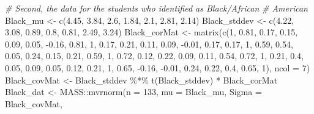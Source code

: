 \documentclass[
  11pt,
]{book}
\newenvironment{Shaded}{\begin{snugshade}}{\end{snugshade}}
\newcommand{\AttributeTok}[1]{\textcolor[rgb]{0.77,0.63,0.00}{#1}}
\newcommand{\CommentTok}[1]{\textcolor[rgb]{0.56,0.35,0.01}{\textit{#1}}}
\newcommand{\DecValTok}[1]{\textcolor[rgb]{0.00,0.00,0.81}{#1}}
\newcommand{\FloatTok}[1]{\textcolor[rgb]{0.00,0.00,0.81}{#1}}
\newcommand{\FunctionTok}[1]{\textcolor[rgb]{0.00,0.00,0.00}{#1}}
\newcommand{\NormalTok}[1]{#1}
\newcommand{\OtherTok}[1]{\textcolor[rgb]{0.56,0.35,0.01}{#1}}
\newcommand{\SpecialCharTok}[1]{\textcolor[rgb]{0.00,0.00,0.00}{#1}}
\begin{document}
\begin{Shaded}
\begin{Highlighting}[]
\CommentTok{\# Second, the data for the students who identified as Black/African}
\CommentTok{\# American}
\NormalTok{Black\_mu }\OtherTok{\textless{}{-}} \FunctionTok{c}\NormalTok{(}\FloatTok{4.45}\NormalTok{, }\FloatTok{3.84}\NormalTok{, }\FloatTok{2.6}\NormalTok{, }\FloatTok{1.84}\NormalTok{, }\FloatTok{2.1}\NormalTok{, }\FloatTok{2.81}\NormalTok{, }\FloatTok{2.14}\NormalTok{)}
\NormalTok{Black\_stddev }\OtherTok{\textless{}{-}} \FunctionTok{c}\NormalTok{(}\FloatTok{4.22}\NormalTok{, }\FloatTok{3.08}\NormalTok{, }\FloatTok{0.89}\NormalTok{, }\FloatTok{0.8}\NormalTok{, }\FloatTok{0.81}\NormalTok{, }\FloatTok{2.49}\NormalTok{, }\FloatTok{3.24}\NormalTok{)}
\NormalTok{Black\_corMat }\OtherTok{\textless{}{-}} \FunctionTok{matrix}\NormalTok{(}\FunctionTok{c}\NormalTok{(}\DecValTok{1}\NormalTok{, }\FloatTok{0.81}\NormalTok{, }\FloatTok{0.17}\NormalTok{, }\FloatTok{0.15}\NormalTok{, }\FloatTok{0.09}\NormalTok{, }\FloatTok{0.05}\NormalTok{, }\SpecialCharTok{{-}}\FloatTok{0.16}\NormalTok{, }\FloatTok{0.81}\NormalTok{,}
    \DecValTok{1}\NormalTok{, }\FloatTok{0.17}\NormalTok{, }\FloatTok{0.21}\NormalTok{, }\FloatTok{0.11}\NormalTok{, }\FloatTok{0.09}\NormalTok{, }\SpecialCharTok{{-}}\FloatTok{0.01}\NormalTok{, }\FloatTok{0.17}\NormalTok{, }\FloatTok{0.17}\NormalTok{, }\DecValTok{1}\NormalTok{, }\FloatTok{0.59}\NormalTok{, }\FloatTok{0.54}\NormalTok{, }\FloatTok{0.05}\NormalTok{,}
    \FloatTok{0.24}\NormalTok{, }\FloatTok{0.15}\NormalTok{, }\FloatTok{0.21}\NormalTok{, }\FloatTok{0.59}\NormalTok{, }\DecValTok{1}\NormalTok{, }\FloatTok{0.72}\NormalTok{, }\FloatTok{0.12}\NormalTok{, }\FloatTok{0.22}\NormalTok{, }\FloatTok{0.09}\NormalTok{, }\FloatTok{0.11}\NormalTok{, }\FloatTok{0.54}\NormalTok{, }\FloatTok{0.72}\NormalTok{,}
    \DecValTok{1}\NormalTok{, }\FloatTok{0.21}\NormalTok{, }\FloatTok{0.4}\NormalTok{, }\FloatTok{0.05}\NormalTok{, }\FloatTok{0.09}\NormalTok{, }\FloatTok{0.05}\NormalTok{, }\FloatTok{0.12}\NormalTok{, }\FloatTok{0.21}\NormalTok{, }\DecValTok{1}\NormalTok{, }\FloatTok{0.65}\NormalTok{, }\SpecialCharTok{{-}}\FloatTok{0.16}\NormalTok{, }\SpecialCharTok{{-}}\FloatTok{0.01}\NormalTok{,}
    \FloatTok{0.24}\NormalTok{, }\FloatTok{0.22}\NormalTok{, }\FloatTok{0.4}\NormalTok{, }\FloatTok{0.65}\NormalTok{, }\DecValTok{1}\NormalTok{), }\AttributeTok{ncol =} \DecValTok{7}\NormalTok{)}
\NormalTok{Black\_covMat }\OtherTok{\textless{}{-}}\NormalTok{ Black\_stddev }\SpecialCharTok{\%*\%} \FunctionTok{t}\NormalTok{(Black\_stddev) }\SpecialCharTok{*}\NormalTok{ Black\_corMat}
\NormalTok{Black\_dat }\OtherTok{\textless{}{-}}\NormalTok{ MASS}\SpecialCharTok{::}\FunctionTok{mvrnorm}\NormalTok{(}\AttributeTok{n =} \DecValTok{133}\NormalTok{, }\AttributeTok{mu =}\NormalTok{ Black\_mu, }\AttributeTok{Sigma =}\NormalTok{ Black\_covMat,}

\end{Highlighting}
\end{Shaded}
\end{document}
